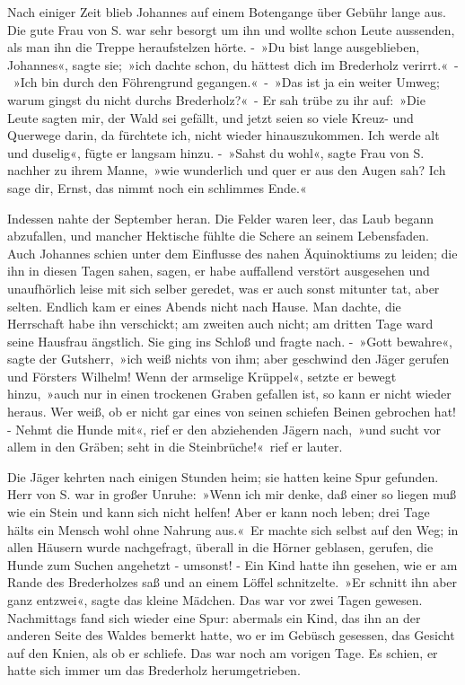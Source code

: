 Nach einiger Zeit blieb Johannes auf einem Botengange über Gebühr lange aus. Die gute Frau von S. war sehr besorgt um ihn und wollte schon Leute aussenden, als man ihn die Treppe heraufstelzen hörte. - »Du bist lange ausgeblieben, Johannes«, sagte sie; »ich dachte schon, du hättest dich im Brederholz verirrt.« - »Ich bin durch den Föhrengrund gegangen.« - »Das ist ja ein weiter Umweg; warum gingst du nicht durchs Brederholz?« - Er sah trübe zu ihr auf: »Die Leute sagten mir, der Wald sei gefällt, und jetzt seien so viele Kreuz- und Querwege darin, da fürchtete ich, nicht wieder hinauszukommen. Ich werde alt und duselig«, fügte er langsam hinzu. - »Sahst du wohl«, sagte Frau von S. nachher zu ihrem Manne, »wie wunderlich und quer er aus den Augen sah? Ich sage dir, Ernst, das nimmt noch ein schlimmes Ende.«

Indessen nahte der September heran. Die Felder waren leer, das Laub begann abzufallen, und mancher Hektische fühlte die Schere an seinem Lebensfaden. Auch Johannes schien unter dem Einflusse des nahen Äquinoktiums zu leiden; die ihn in diesen Tagen sahen, sagen, er habe auffallend verstört ausgesehen und unaufhörlich leise mit sich selber geredet, was er auch sonst mitunter tat, aber selten. Endlich kam er eines Abends nicht nach Hause. Man dachte, die Herrschaft habe ihn verschickt; am zweiten auch nicht; am dritten Tage ward seine Hausfrau ängstlich. Sie ging ins Schloß und fragte nach. - »Gott bewahre«, sagte der Gutsherr, »ich weiß nichts von ihm; aber geschwind den Jäger gerufen und Försters Wilhelm! Wenn der armselige Krüppel«, setzte er bewegt hinzu, »auch nur in einen trockenen Graben gefallen ist, so kann er nicht wieder heraus. Wer weiß, ob er nicht gar eines von seinen schiefen Beinen gebrochen hat! - Nehmt die Hunde mit«, rief er den abziehenden Jägern nach, »und sucht vor allem in den Gräben; seht in die Steinbrüche!« rief er lauter.

Die Jäger kehrten nach einigen Stunden heim; sie hatten keine Spur gefunden. Herr von S. war in großer Unruhe: »Wenn ich mir denke, daß einer so liegen muß wie ein Stein und kann sich nicht helfen! Aber er kann noch leben; drei Tage hälts ein Mensch wohl ohne Nahrung aus.« Er machte sich selbst auf den Weg; in allen Häusern wurde nachgefragt, überall in die Hörner geblasen, gerufen, die Hunde zum Suchen angehetzt - umsonst! - Ein Kind hatte ihn gesehen, wie er am Rande des Brederholzes saß und an einem Löffel schnitzelte. »Er schnitt ihn aber ganz entzwei«, sagte das kleine Mädchen. Das war vor zwei Tagen gewesen. Nachmittags fand sich wieder eine Spur: abermals ein Kind, das ihn an der anderen Seite des Waldes bemerkt hatte, wo er im Gebüsch gesessen, das Gesicht auf den Knien, als ob er schliefe. Das war noch am vorigen Tage. Es schien, er hatte sich immer um das Brederholz herumgetrieben.

